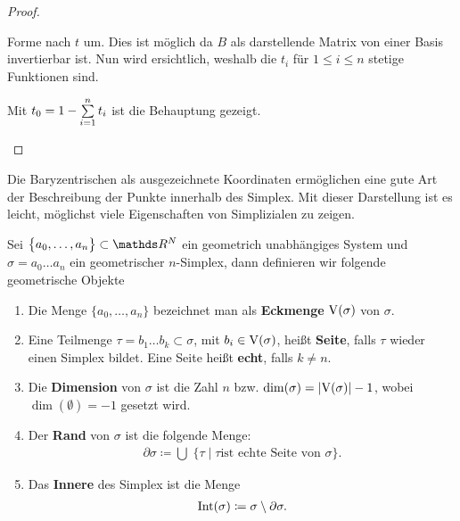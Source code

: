 \begin{Lem}
\begin{proof}
\begin{description}
      Forme nach $t$ um. Dies ist möglich da $B$ als darstellende
      Matrix von einer Basis invertierbar ist. Nun wird ersichtlich,
      weshalb die $t_i$ für $1 \leq i \leq n$ stetige Funktionen sind.

      \pagebreak

      Mit $t_0 = 1 - \sp{1}{n} t_i$ ist die Behauptung gezeigt.
    \end{description}
  \end{proof}
\end{Lem}

Die Baryzentrischen als ausgezeichnete Koordinaten ermöglichen eine
gute Art der Beschreibung der Punkte innerhalb des Simplex. Mit dieser
Darstellung ist es leicht, möglichst viele Eigenschaften von Simplizialen
zu zeigen.

\begin{Def}
  Sei $\sset{a_0,\ldots ,a_n} \subset \R^N$ ein geometrich
  unabhängiges System und $\sigma = a_0 \ldots a_n$ ein geometrischer
  $n$-Simplex, dann definieren wir folgende geometrische Objekte
  \begin{enumerate}[\textbullet]
  \item Die Menge $\{ a_0 , \ldots , a_n \}$ bezeichnet man als
    \textbf{Eckmenge} $\V(\sigma)$ von $\sigma$.
  \item Eine Teilmenge $\tau = b_1 \ldots b_k \subset \sigma$, mit
    $b_i \in \V(\sigma)$, heißt \textbf{Seite}, falls $\tau$ wieder
    einen Simplex bildet. Eine Seite heißt \textbf{echt}, falls
    $k \neq n$.
  \item Die \textbf{Dimension} von $\sigma$ ist die Zahl $n$ bzw.
    $\dim(\sigma) = \gr{\V(\sigma)} - 1$, wobei $\dim(\emptyset)=-1$
    gesetzt wird.
  \item Der \textbf{Rand} von $\sigma$ ist die folgende Menge:
    \begin{gather*}
      \partial\sigma \coloneqq \bigcup \; \bigl\{ \tau \; | \; \tau \text{
          ist echte Seite von } \sigma \bigr\}.
    \end{gather*}
  \item Das \textbf{Innere} des Simplex ist die Menge
    \begin{gather*}
    	\Int(\sigma) \coloneqq \sigma \setminus \partial\sigma.
    \end{gather*}
  \end{enumerate}
\end{Def}


